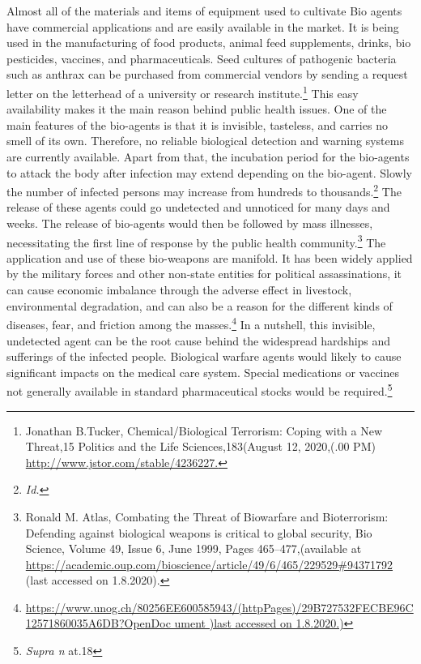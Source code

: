 \begin{multicols}{2}
\vspace{-.1cm}


\vspace{-.1cm}

\noi
Almost all of the materials and items of equipment used to cultivate Bio agents have
commercial applications and are easily available in the market. It is being used in the
manufacturing of food products, animal feed supplements, drinks, bio pesticides, vaccines,
and pharmaceuticals. Seed cultures of pathogenic bacteria such as anthrax can be purchased
from commercial vendors by sending a request letter on the letterhead of a university or
research institute.\footnote{Jonathan B.Tucker, Chemical/Biological Terrorism: Coping with a New Threat,15 Politics and the Life Sciences,183(August 12, 2020,(.00 PM) \url{http://www.jstor.com/stable/4236227.}} This easy availability makes it the main reason behind public health
issues. One of the main features of the bio-agents is that it is invisible, tasteless, and carries
no smell of its own. Therefore, no reliable biological detection and warning systems are
currently available. Apart from that, the incubation period for the bio-agents to attack the
body after infection may extend depending on the bio-agent. Slowly the number of infected
persons may increase from hundreds to thousands.\footnote{\textit{Id.}} The release of these agents could go
undetected and unnoticed for many days and weeks. The release of bio-agents would then be
followed by mass illnesses, necessitating the first line of response by the public health
community.\footnote{Ronald M. Atlas, Combating the Threat of Biowarfare and Bioterrorism: Defending against biological weapons is critical to global security, Bio Science, Volume 49, Issue 6, June 1999, Pages 465–477,(available at \url{https://academic.oup.com/bioscience/article/49/6/465/229529#94371792} (last accessed on 1.8.2020). }  The application and use of these bio-weapons are manifold. It has been widely
applied by the military forces and other non-state entities for political assassinations, it can
cause economic imbalance through the adverse effect in livestock, environmental degradation, and can also be a reason for the different kinds of diseases, fear, and friction
among the masses.\footnote{\url{https://www.unog.ch/80256EE600585943/(httpPages)/29B727532FECBE96C12571860035A6DB?OpenDoc
ument )last accessed on 1.8.2020.)}} In a nutshell, this invisible, undetected agent can be the root cause
behind the widespread hardships and sufferings of the infected people. Biological warfare
agents would likely to cause significant impacts on the medical care system. Special
medications or vaccines not generally available in standard pharmaceutical stocks would be
required.\footnote{\textit{Supra n} at.18}


\end{multicols}
